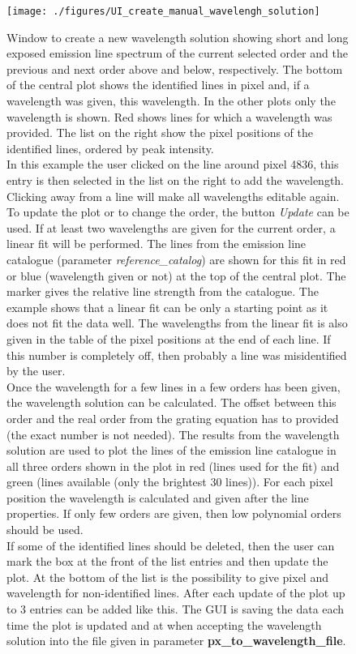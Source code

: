\documentclass[10pt,a4paper]{article}
\begin{document}
\begin{figure} 
  \begin{center}
    \texttt{[image: ./figures/UI\_create\_manual\_wavelengh\_solution]}
  \end{center} 
  \caption{Window to create a new wavelength solution showing short and long exposed emission line spectrum of the current selected order and the previous and next order above and below, respectively. The bottom of the central plot shows the identified lines in pixel and, if a wavelength was given, this wavelength. In the other plots only the wavelength is shown. Red shows lines for which a wavelength was provided. The list on the right show the pixel positions of the identified lines, ordered by peak intensity. \\
    In this example the user clicked on the line around pixel 4836, this entry is then selected in the list on the right to add the wavelength. Clicking away from a line will make all wavelengths editable again. \\
    To update the plot or to change the order, the button \textit{Update} can be used. If at least two wavelengths are given for the current order, a linear fit will be performed. The lines from the emission line catalogue (parameter \textit{reference\_catalog}) are shown for this fit in red or blue (wavelength given or not) at the top of the central plot. The marker gives the relative line strength from the catalogue. The example shows that a linear fit can be only a starting point as it does not fit the data well. The wavelengths from the linear fit is also given in the table of the pixel positions at the end of each line. If this number is completely off, then probably a line was misidentified by the user. \\
    Once the wavelength for a few lines in a few orders has been given, the wavelength solution can be calculated. The offset between this order and the real order from the grating equation has to provided (the exact number is not needed). The results from the wavelength solution are used to plot the lines of the emission line catalogue in all three orders shown in the plot in red (lines used for the fit) and green (lines available (only the brightest 30 lines)). For each pixel position the wavelength is calculated and given after the line properties. If only few orders are given, then low polynomial orders should be used. \\
    If some of the identified lines should be deleted, then the user can mark the box at the front of the list entries and then update the plot. At the bottom of the list is the possibility to give pixel and wavelength for non-identified lines. After each update of the plot up to 3 entries can be added like this. The GUI is saving the data each time the plot is updated and at when accepting the wavelength solution into the file given in parameter \textbf{px\_to\_wavelength\_file}.
    \label{Fig:UI_create_manual_wavelengh_solution}}
\end{figure}
\end{document}
